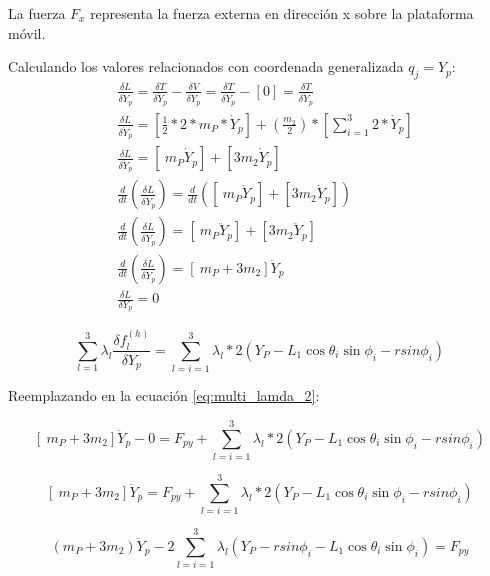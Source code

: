             La fuerza \( F_{x} \)  representa la fuerza externa en dirección x sobre la plataforma móvil.
            
            Calculando los valores relacionados con coordenada generalizada  \( q_{j}=Y_{p} \):
        \begin{align*}
             &\frac{ \delta L}{ \delta \dot{Y}_{p}}=\frac{ \delta T}{ \delta \dot{Y}_{p}}-\frac{ \delta V}{ \delta \dot{Y}_{p}}=\frac{ \delta T}{ \delta \dot{Y}_{p}}- \left[ 0 \right] =\frac{ \delta T}{ \delta \dot{Y}_{p}} \\
             &\frac{ \delta L}{ \delta \dot{Y}_{p}}= \left[ \frac{1}{2}\ast 2 \ast   m_{P}\ast\dot{Y}_{p} \right] + \left( \frac{m_{2}}{2} \right) \ast \left[  \sum _{i=1}^{3}2\ast\dot{Y}_{p} \right]  \\
             &\frac{ \delta L}{ \delta \dot{Y}_{p}}= \left[ ~m_{P}\dot{Y}_{p} \right] + \left[ 3m_{2}\dot{Y}_{p} \right]  \\
             &\frac{d}{dt} \left( \frac{ \delta L}{ \delta \dot{Y}_{p}} \right) =\frac{d}{dt} \left(  \left[ ~m_{P}\dot{Y}_{p} \right] + \left[ 3m_{2}\dot{Y}_{p} \right]  \right)  \\
             &\frac{d}{dt} \left( \frac{ \delta L}{ \delta \dot{Y}_{p}} \right) = \left[ ~m_{P}\ddot{Y}_{p} \right] + \left[ 3m_{2}\ddot{Y}_{p} \right]  \\
             &\frac{d}{dt} \left( \frac{ \delta L}{ \delta \dot{Y}_{p}} \right) = \left[ ~m_{P}+3m_{2} \right] \ddot{Y}_{p} \\
             &\frac{ \delta L}{ \delta Y_{p}}=0 
            \end{align*} 
            
             \[  \sum _{l=1}^{3} \lambda _{l}\frac{ \delta f_{l}^{ \left( h \right) }}{ \delta Y_{p}}= \sum _{l=i=1}^{3} \lambda _{l}\ast 2 \left( Y_{P}-L_{1}\cos  \theta _{i}\sin  \phi _{i}- rsin \phi _{i} \right)  \] 
            
            Reemplazando en la ecuación \ref{eq:multi_lamda_2}:

             \[  \left[ ~m_{P}+3m_{2} \right] \ddot{Y}_{p}-0=F_{py}+ \sum _{l=i=1}^{3} \lambda _{l}\ast 2 \left( Y_{P}-L_{1}\cos  \theta _{i}\sin  \phi _{i}- rsin \phi _{i} \right)  \] 

             \[  \left[ ~m_{P}+3m_{2} \right] \ddot{Y}_{p}=F_{py}+ \sum _{l=i=1}^{3} \lambda _{l}\ast 2 \left( Y_{P}-L_{1}\cos  \theta _{i}\sin  \phi _{i}- rsin \phi _{i} \right)  \] 

            \begin{equation}
                 \left( m_{P}+3m_{2} \right) \ddot{Y}_{p}-2 \sum _{l=i=1}^{3} \lambda _{l} \left( Y_{P}- rsin \phi _{i}-L_{1}\cos  \theta _{i}\sin  \phi _{i} \right) =F_{py}
            \end{equation}

